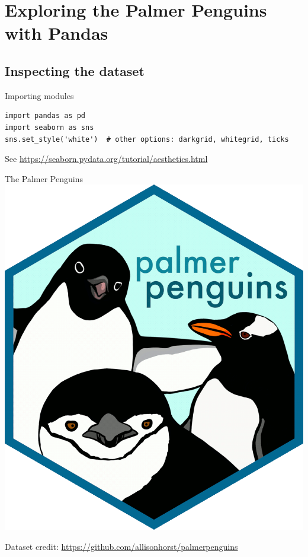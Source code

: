 \documentclass[aspectratio=169,usenames,dvipsnames]{beamer}
\begin{document}
\section{Exploring the Palmer Penguins with Pandas}
\subsection{Inspecting the dataset}
\frame{\tableofcontents[currentsubsection]}

%

\begin{frame}[fragile]{Importing modules}
\begin{lstlisting}
import pandas as pd
import seaborn as sns
sns.set_style('white')  # other options: darkgrid, whitegrid, ticks
\end{lstlisting}

See \url{https://seaborn.pydata.org/tutorial/aesthetics.html}
\end{frame}

\begin{frame}{The Palmer Penguins}\centering
    \includegraphics[width=.7\textheight]{fig/palmerpenguins}

    Dataset credit: \url{https://github.com/allisonhorst/palmerpenguins}
\end{frame}
\end{document}

